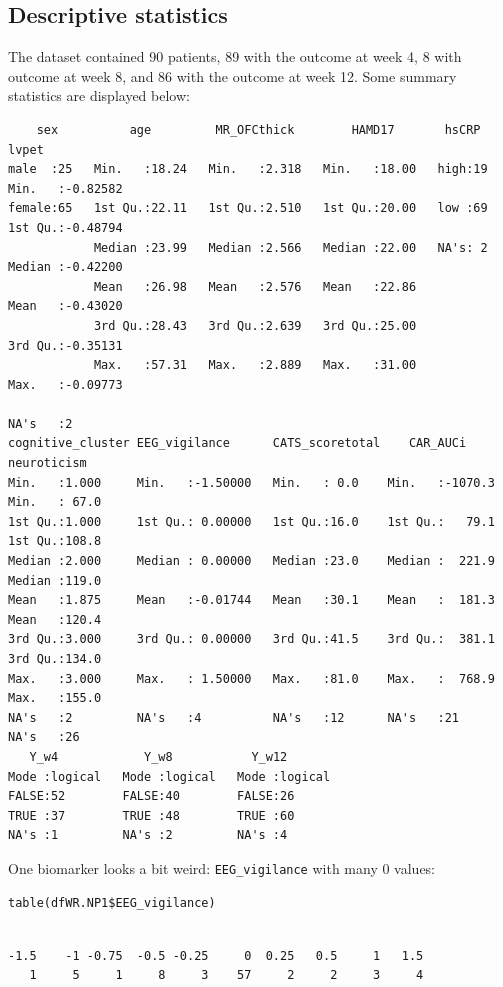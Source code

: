 \documentclass[12pt]{article}
\begin{document}
\subsection{Descriptive statistics}
\label{sec:org49b4f6a}

The dataset contained 90 patients, 89 with the outcome at week 4, 8
with outcome at week 8, and 86 with the outcome at week 12. Some
summary statistics are displayed below:
\begin{verbatim}
    sex          age         MR_OFCthick        HAMD17       hsCRP        lvpet         
male  :25   Min.   :18.24   Min.   :2.318   Min.   :18.00   high:19   Min.   :-0.82582  
female:65   1st Qu.:22.11   1st Qu.:2.510   1st Qu.:20.00   low :69   1st Qu.:-0.48794  
            Median :23.99   Median :2.566   Median :22.00   NA's: 2   Median :-0.42200  
            Mean   :26.98   Mean   :2.576   Mean   :22.86             Mean   :-0.43020  
            3rd Qu.:28.43   3rd Qu.:2.639   3rd Qu.:25.00             3rd Qu.:-0.35131  
            Max.   :57.31   Max.   :2.889   Max.   :31.00             Max.   :-0.09773  
                                                                      NA's   :2         
cognitive_cluster EEG_vigilance      CATS_scoretotal    CAR_AUCi        neuroticism   
Min.   :1.000     Min.   :-1.50000   Min.   : 0.0    Min.   :-1070.3   Min.   : 67.0  
1st Qu.:1.000     1st Qu.: 0.00000   1st Qu.:16.0    1st Qu.:   79.1   1st Qu.:108.8  
Median :2.000     Median : 0.00000   Median :23.0    Median :  221.9   Median :119.0  
Mean   :1.875     Mean   :-0.01744   Mean   :30.1    Mean   :  181.3   Mean   :120.4  
3rd Qu.:3.000     3rd Qu.: 0.00000   3rd Qu.:41.5    3rd Qu.:  381.1   3rd Qu.:134.0  
Max.   :3.000     Max.   : 1.50000   Max.   :81.0    Max.   :  768.9   Max.   :155.0  
NA's   :2         NA's   :4          NA's   :12      NA's   :21        NA's   :26     
   Y_w4            Y_w8           Y_w12        
Mode :logical   Mode :logical   Mode :logical  
FALSE:52        FALSE:40        FALSE:26       
TRUE :37        TRUE :48        TRUE :60       
NA's :1         NA's :2         NA's :4
\end{verbatim}

One biomarker looks a bit weird: \texttt{EEG\_vigilance} with many 0 values:
\lstset{language=r,label= ,caption= ,captionpos=b,numbers=none}
\begin{lstlisting}
table(dfWR.NP1$EEG_vigilance)
\end{lstlisting}

\begin{verbatim}

-1.5    -1 -0.75  -0.5 -0.25     0  0.25   0.5     1   1.5 
   1     5     1     8     3    57     2     2     3     4
\end{verbatim}
\end{document}
